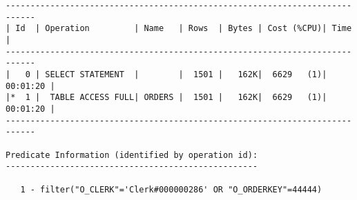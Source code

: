 \documentclass[11pt,a4paper,parskip=half]{scrartcl}
\begin{document}
\begin{lstlisting}
----------------------------------------------------------------------------                                                                                                                                                                                                                                 
| Id  | Operation         | Name   | Rows  | Bytes | Cost (%CPU)| Time     |                                                                                                                                                                                                                                 
----------------------------------------------------------------------------                                                                                                                                                                                                                                 
|   0 | SELECT STATEMENT  |        |  1501 |   162K|  6629   (1)| 00:01:20 |                                                                                                                                                                                                                                 
|*  1 |  TABLE ACCESS FULL| ORDERS |  1501 |   162K|  6629   (1)| 00:01:20 |                                                                                                                                                                                                                                 
----------------------------------------------------------------------------                                                                                                                                                                                                                                 
                                                                                                                                                                                                                                                                                                             
Predicate Information (identified by operation id):                                                                                                                                                                                                                                                          
---------------------------------------------------                                                                                                                                                                                                                                                          
                                                                                                                                                                                                                                                                                                             
   1 - filter("O_CLERK"='Clerk#000000286' OR "O_ORDERKEY"=44444)    
\end{lstlisting}
\end{document}
